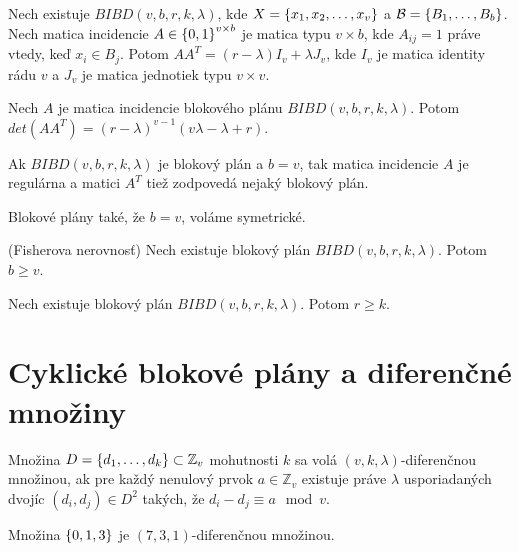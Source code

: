 \begin{theorem}

Nech existuje $BIBD(v, b,r, k, \lambda)$, kde $X = \left\{x_1, x_2, \ldots, x_v\right\}$ a $\mathcal{B} = \left\{B_1, \ldots, B_b\right\}$. 
Nech matica incidencie $A \in \left\{0, 1\right\}^{v \times b}$ je matica typu $v\times b$, kde $A_{ij} = 1$ práve vtedy, keď $x_i \in B_j$.
Potom $A A^T = (r-\lambda) I_v + \lambda J_{v}$, 
kde $I_v$ je matica identity rádu $v$ a 
$J_v$ je matica jednotiek typu $v \times v$.
\end{theorem}

\begin{lemma}
Nech $A$ je matica incidencie blokového plánu $BIBD(v, b,r, k, \lambda)$. Potom $det(AA^T) = (r-\lambda)^{v-1} (v\lambda - \lambda + r)$.
\end{lemma}

\begin{corollary}
Ak $BIBD(v, b,r, k, \lambda)$ je blokový plán a $b=v$, tak matica incidencie $A$ je regulárna a matici $A^T$ tiež zodpovedá nejaký blokový plán.
\end{corollary}

\begin{remark}
Blokové plány také, že $b = v$, voláme symetrické.
\end{remark}


\begin{theorem}{(Fisherova nerovnosť)}
Nech existuje blokový plán $BIBD(v, b,r, k, \lambda)$. Potom $b \geq v$.
\end{theorem}

\begin{corollary}
Nech existuje blokový plán $BIBD(v, b,r, k, \lambda)$. Potom $r \geq k$.
\end{corollary}

\section{Cyklické blokové plány a diferenčné množiny}

\begin{definition}

Množina $D = \left\{d_1, \ldots, d_k\right\} \subset \mathbb{Z}_v$ mohutnosti $k$ sa volá $(v, k, \lambda)$-diferenčnou množinou, ak 
pre každý nenulový prvok $a \in \mathbb{Z}_v$ existuje práve $\lambda$ usporiadaných dvojíc $(d_i, d_j) \in D^2$ takých, že
$d_i - d_j \equiv a \mod v$. 
\end{definition}

\begin{remark}

Množina $\left\{0, 1, 3\right\}$ je $(7, 3, 1)$-diferenčnou množinou.

\end{remark}

